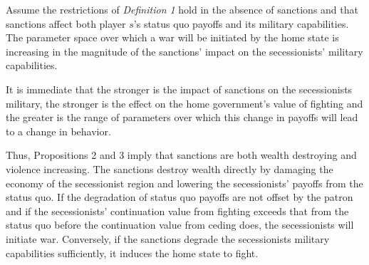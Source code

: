 \begin{proposition}
Assume the restrictions of \emph{Definition 1} hold in the absence of sanctions and that sanctions affect both player $s$'s status quo payoffs and its military capabilities. The parameter space over which a war will be initiated by the home state is increasing in the magnitude of the sanctions' impact on the secessionists' military capabilities.
\end{proposition}

It is immediate that the stronger is the impact of sanctions on the secessionists military, the stronger is the effect on the home government's value of fighting and the greater is the range of parameters over which this change in payoffs will lead to a change in behavior.

Thus, Propositions 2 and 3 imply that sanctions are both wealth destroying and violence increasing. The sanctions destroy wealth directly by damaging the economy of the secessionist region and lowering the secessionists' payoffs from the status quo. If the degradation of status quo payoffs are not offset by the patron and if the secessionists' continuation value from fighting exceeds that from the status quo before the continuation value from ceding does, the secessionists will initiate war. Conversely, if the sanctions degrade the secessionists military capabilities sufficiently, it induces the home state to fight.



